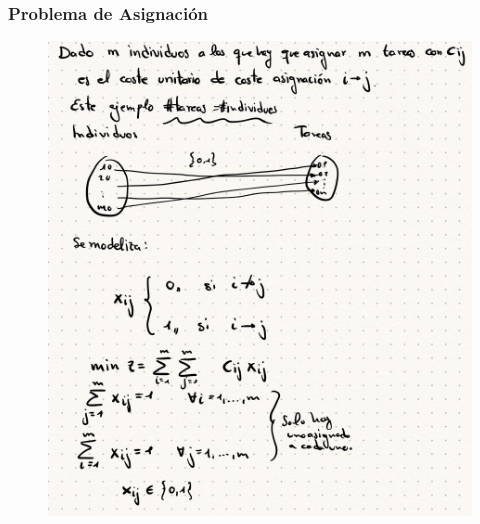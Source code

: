 \documentclass[12pt, twoside, openright]{report} %
\begin{document}
\subsubsection{Problema de Asignación}
\begin{figure}[H]
	{\includegraphics[scale=.25]{Untitled 16.png}}
\end{figure}
\end{document}

